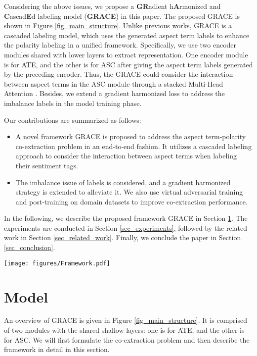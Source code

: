 \documentclass[11pt,a4paper]{article}
\begin{document}
Considering the above issues, we propose a \textbf{GR}adient h\textbf{A}rmonized and \textbf{C}ascad\textbf{E}d labeling model (\textbf{GRACE}) in this paper. The proposed GRACE is shown in Figure \ref{fig_main_structure}. Unlike previous works, GRACE is a cascaded labeling model, which uses the generated aspect term labels to enhance the polarity labeling in a unified framework. Specifically, we use two encoder modules shared with lower layers to extract representation. One encoder module is for ATE, and the other is for ASC after giving the aspect term labels generated by the preceding encoder. Thus, the GRACE could consider the interaction between aspect terms in the ASC module through a stacked Multi-Head Attention \cite{Vaswani2017}. Besides, we extend a gradient harmonized loss to address the imbalance labels in the model training phase.

Our contributions are summarized as follows:
\begin{itemize}
    \item A novel framework GRACE is proposed to address the aspect term-polarity co-extraction problem in an end-to-end fashion. It utilizes a cascaded labeling approach to consider the interaction between aspect terms when labeling their sentiment tags.
    \item The imbalance issue of labels is considered, and a gradient harmonized strategy is extended to alleviate it. We also use virtual adversarial training and post-training on domain datasets to improve co-extraction performance.
\end{itemize}
In the following, we describe the proposed framework GRACE in Section \ref{sec_model}. The experiments are conducted in Section \ref{sec_experiments}, followed by the related work in Section \ref{sec_related_work}. Finally, we conclude the paper in Section \ref{sec_conclusion}.
\begin{figure*}[tp] 
    \centering
    \texttt{[image: figures/Framework.pdf]} 
    \caption{The main structure of our \textbf{GRACE}. It is a cascaded labeling architecture, which means that the generated aspect term labels [O,B,I,O,B] are fed to the right part as key $K$ and value $V$ to generate sentiment labels [O,\texttt{POS},\texttt{POS},O,\texttt{POS}]. The perturbed embeddings $r_\cdot$ is added to the Token embeddings $\mathit{E}_\cdot$.}
    \label{fig_main_structure}
\end{figure*}

\section{Model}
\label{sec_model}
An overview of GRACE is given in Figure \ref{fig_main_structure}. It is comprised of two modules with the shared shallow layers: one is for ATE, and the other is for ASC. We will first formulate the co-extraction problem and then describe the framework in detail in this section.
\end{document}
